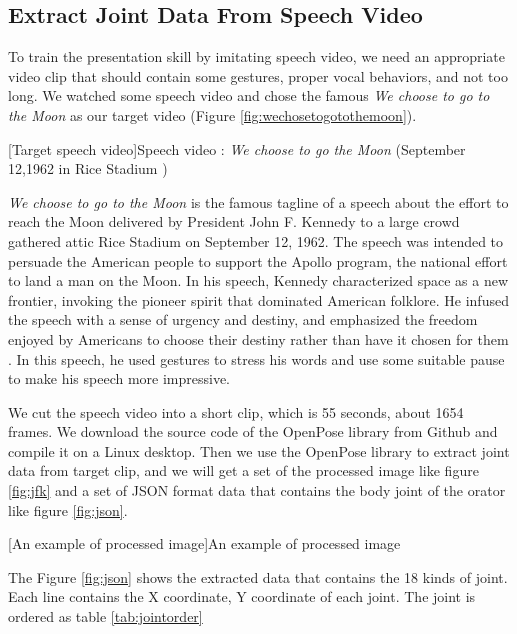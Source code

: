 \subsection*{Extract Joint Data From Speech Video}

\par To train the presentation skill by imitating speech video, we need an appropriate video clip that should contain some gestures, proper vocal behaviors, and not too long. We watched some speech video and chose the famous \textit{We choose to go to the Moon} as our target video (Figure \ref{fig:wechosetogotothemoon}).


[Target speech video]{Speech video : \textit{We choose to go the Moon} (September 12,1962 in Rice Stadium )}

\par \textit{We choose to go to the Moon} is the famous tagline of a speech about the effort to reach the Moon delivered by President John F. Kennedy to a large crowd gathered attic Rice Stadium on September 12, 1962. The speech was intended to persuade the American people to support the Apollo program, the national effort to land a man on the Moon. In his speech, Kennedy characterized space as a new frontier, invoking the pioneer spirit that dominated American folklore. He infused the speech with a sense of urgency and destiny, and emphasized the freedom enjoyed by Americans to choose their destiny rather than have it chosen for them \cite{Affairs}. In this speech, he used gestures to stress his words and use some suitable pause to make his speech more impressive.

\par We cut the speech video into a short clip, which is 55 seconds, about 1654 frames. We download the source code of the OpenPose library from Github and compile it on a Linux desktop. Then we use the OpenPose library to extract joint data from target clip, and we will get a set of the processed image like figure \ref{fig:jfk}  and a set of JSON format data that contains the body joint of the orator like figure \ref{fig:json}.

[An example of processed image]{An example of processed image}

\par The Figure \ref{fig:json} shows the extracted data that contains the 18 kinds of joint. Each line contains the X coordinate, Y coordinate of each joint. The joint is ordered as table \ref{tab:jointorder}

